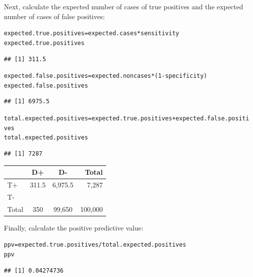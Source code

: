 \documentclass{report}\usepackage[]{graphicx}\usepackage[]{color}
\makeatletter
\newcommand{\hlnum}[1]{\textcolor[rgb]{0.686,0.059,0.569}{#1}}%
\newcommand{\hlopt}[1]{\textcolor[rgb]{0,0,0}{#1}}%
\newcommand{\hlstd}[1]{\textcolor[rgb]{0.345,0.345,0.345}{#1}}%
\newcommand{\hlkwb}[1]{\textcolor[rgb]{0.69,0.353,0.396}{#1}}%
\newenvironment{kframe}{%
 \def\at@end@of@kframe{}%
 \ifinner\ifhmode%
  \def\at@end@of@kframe{\end{minipage}}%
  \begin{minipage}{\columnwidth}%
 \fi\fi%
 \def\FrameCommand##1{\hskip\@totalleftmargin \hskip-\fboxsep
 \colorbox{shadecolor}{##1}\hskip-\fboxsep
     \hskip-\linewidth \hskip-\@totalleftmargin \hskip\columnwidth}%
 \MakeFramed {\advance\hsize-\width
   \@totalleftmargin\z@ \linewidth\hsize
   \@setminipage}}%
 {\par\unskip\endMakeFramed%
 \at@end@of@kframe}
\newenvironment{knitrout}{}{} %
\makeatother
\begin{document}
Next, calculate the expected number of cases of true positives and the expected number of cases of false positives:  
\begin{knitrout}
\color{fgcolor}\begin{kframe}
\begin{alltt}
\hlstd{expected.true.positives} \hlkwb{=} \hlstd{expected.cases} \hlopt{*} \hlstd{sensitivity}
\hlstd{expected.true.positives}
\end{alltt}
\begin{verbatim}
## [1] 311.5
\end{verbatim}
\begin{alltt}
\hlstd{expected.false.positives} \hlkwb{=} \hlstd{expected.noncases} \hlopt{*} \hlstd{(}\hlnum{1} \hlopt{-} \hlstd{specificity)}
\hlstd{expected.false.positives}
\end{alltt}
\begin{verbatim}
## [1] 6975.5
\end{verbatim}
\begin{alltt}
\hlstd{total.expected.positives} \hlkwb{=} \hlstd{expected.true.positives} \hlopt{+} \hlstd{expected.false.positives}
\hlstd{total.expected.positives}
\end{alltt}
\begin{verbatim}
## [1] 7287
\end{verbatim}
\end{kframe}
\end{knitrout}

 
\begin{center}
\begin{tabular}{|l|c|c|r|}
\hline 
& D+ & D- & Total\\ 
\hline
T+ & 311.5 & 6,975.5 & 7,287\\ 
\hline
T- & & & \\ 
\hline 
Total & 350 & 99,650 & 100,000 \\ 
\hline 
\end{tabular} 
\end{center}

Finally, calculate the positive predictive value: 
\begin{knitrout}
\color{fgcolor}\begin{kframe}
\begin{alltt}
\hlstd{ppv} \hlkwb{=} \hlstd{expected.true.positives}\hlopt{/}\hlstd{total.expected.positives}
\hlstd{ppv}
\end{alltt}
\begin{verbatim}
## [1] 0.04274736
\end{verbatim}
\end{kframe}
\end{knitrout}
\end{document}
